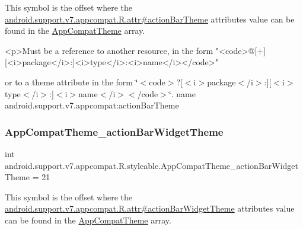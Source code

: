 This symbol is the offset where the \hyperlink{classandroid_1_1support_1_1v7_1_1appcompat_1_1R_1_1attr_a09e7f5fd84af8514b716aff933df644c}{android.\+support.\+v7.\+appcompat.\+R.\+attr\#action\+Bar\+Theme} attribute\textquotesingle{}s value can be found in the \hyperlink{classandroid_1_1support_1_1v7_1_1appcompat_1_1R_1_1styleable_a5c42f89e8a410c323be34208d75c430b}{App\+Compat\+Theme} array.

\begin{DoxyVerb}      <p>Must be a reference to another resource, in the form "<code>@[+][<i>package</i>:]<i>type</i>:<i>name</i></code>"
\end{DoxyVerb}
 or to a theme attribute in the form \char`\"{}$<$code$>$?\mbox{[}$<$i$>$package$<$/i$>$\+:\mbox{]}\mbox{[}$<$i$>$type$<$/i$>$\+:\mbox{]}$<$i$>$name$<$/i$>$$<$/code$>$\char`\"{}.  name android.\+support.\+v7.\+appcompat\+:action\+Bar\+Theme \mbox{\label{classandroid_1_1support_1_1v7_1_1appcompat_1_1R_1_1styleable_ab810dc14bfe475a34217707ee6129736}} 
\subsubsection{\texorpdfstring{App\+Compat\+Theme\+\_\+action\+Bar\+Widget\+Theme}{AppCompatTheme\_actionBarWidgetTheme}}
{\footnotesize\ttfamily int android.\+support.\+v7.\+appcompat.\+R.\+styleable.\+App\+Compat\+Theme\+\_\+action\+Bar\+Widget\+Theme = 21\hspace{0.3cm}{\ttfamily [static]}}

This symbol is the offset where the \hyperlink{classandroid_1_1support_1_1v7_1_1appcompat_1_1R_1_1attr_ac2e72d8d18bc18b83707e4b81ad11060}{android.\+support.\+v7.\+appcompat.\+R.\+attr\#action\+Bar\+Widget\+Theme} attribute\textquotesingle{}s value can be found in the \hyperlink{classandroid_1_1support_1_1v7_1_1appcompat_1_1R_1_1styleable_a5c42f89e8a410c323be34208d75c430b}{App\+Compat\+Theme} array.

